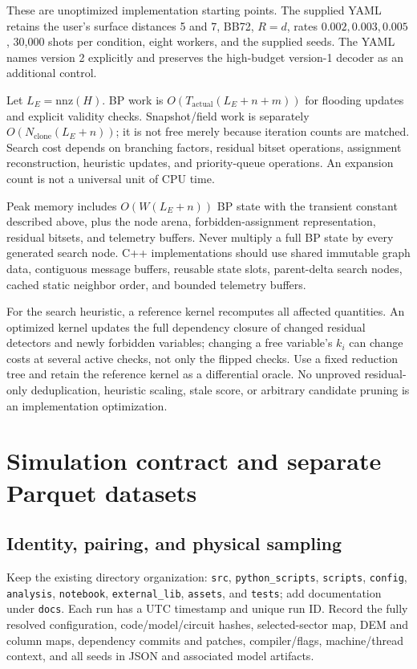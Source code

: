 \documentclass[11pt,a4paper]{article}
\newcommand{\code}[1]{\nolinkurl{#1}}
\begin{document}
These are unoptimized implementation starting points. The supplied YAML retains the user's surface distances 5 and 7, BB72, $R=d$, rates $0.002,0.003,0.005$, 30,000 shots per condition, eight workers, and the supplied seeds. The YAML names version 2 explicitly and preserves the high-budget version-1 decoder as an additional control.

Let $L_E=\mathrm{nnz}(H)$. BP work is $O(T_{\mathrm{actual}}(L_E+n+m))$ for flooding updates and explicit validity checks. Snapshot/field work is separately $O(N_{\mathrm{clone}}(L_E+n))$; it is not free merely because iteration counts are matched. Search cost depends on branching factors, residual bitset operations, assignment reconstruction, heuristic updates, and priority-queue operations. An expansion count is not a universal unit of CPU time.

Peak memory includes $O(W(L_E+n))$ BP state with the transient constant described above, plus the node arena, forbidden-assignment representation, residual bitsets, and telemetry buffers. Never multiply a full BP state by every generated search node. C++ implementations should use shared immutable graph data, contiguous message buffers, reusable state slots, parent-delta search nodes, cached static neighbor order, and bounded telemetry buffers.

For the search heuristic, a reference kernel recomputes all affected quantities. An optimized kernel updates the full dependency closure of changed residual detectors and newly forbidden variables; changing a free variable's $k_i$ can change costs at several active checks, not only the flipped checks. Use a fixed reduction tree and retain the reference kernel as a differential oracle. No unproved residual-only deduplication, heuristic scaling, stale score, or arbitrary candidate pruning is an implementation optimization.

\section{Simulation contract and separate Parquet datasets}
\subsection{Identity, pairing, and physical sampling}
Keep the existing directory organization: \code{src}, \code{python_scripts}, \code{scripts}, \code{config}, \code{analysis}, \code{notebook}, \code{external_lib}, \code{assets}, and \code{tests}; add documentation under \code{docs}. Each run has a UTC timestamp and unique run ID. Record the fully resolved configuration, code/model/circuit hashes, selected-sector map, DEM and column maps, dependency commits and patches, compiler/flags, machine/thread context, and all seeds in JSON and associated model artifacts.
\end{document}
